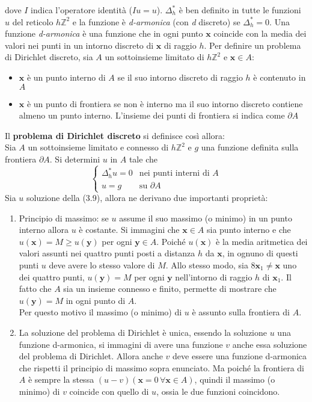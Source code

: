 \documentclass[a4paper,12pt, draft]{article}
\theoremstyle{break}
\numberwithin{equation}{section}
\begin{document}
dove \(I\) indica l'operatore identità (\(Iu = u\)). \(\Delta_h^*\) è ben definito in tutte le funzioni \(u\) del reticolo \(h\mathbb{Z}^2\) e la funzione è \emph{d-armonica} (con \emph{d} discreto) se \(\Delta_h^* = 0\).
Una funzione \emph{d-armonica} è una funzione che in ogni punto \(\bm{x}\) coincide con la media dei valori nei punti in un intorno discreto di \(\bm{x}\) di raggio \(h\).
Per definire un problema di Dirichlet discreto, sia \(A\) un sottoinsieme limitato di \(h\mathbb{Z}^2\) e \(\bm{x} \in A\):
\begin{itemize}
  \item \(\bm{x}\) è un punto interno di \(A\) se il suo intorno discreto di raggio \(h\) è contenuto in \(A\)
  \item $\bm{x}$ è un punto di frontiera se non è interno ma il suo intorno discreto contiene almeno un punto interno. L'insieme dei punti di frontiera si indica come \(\partial A\)
\end{itemize}
Il \textbf{problema di Dirichlet discreto} si definisce così allora: \\
Sia \(A\) un sottoinsieme limitato e connesso di \(h\mathbb{Z}^2\) e \(g\) una funzione definita sulla frontiera \(\partial A\). Si determini \(u\) in \(A\) tale che 
\begin{equation}
  \begin{cases}
    \Delta_h^* u= 0 & \mbox{nei punti interni di }A \\
    u = g & \mbox{su }\partial A
  \end{cases}
\end{equation}
Sia \(u\) soluzione della (3.9), allora ne derivano due importanti proprietà:
\begin{enumerate}
  \item Principio di massimo: se \(u\) assume il suo massimo (o minimo) in un punto interno allora \(u\) è costante. Si immagini che \(\bm{x} \in A\) sia punto interno e che \(u(\bm{x}) = M \geq u(\bm{y})\) per ogni \(\bm{y} \in A\). Poiché \(u(\bm{x})\) è la media aritmetica dei valori assunti nei quattro punti posti a distanza \(h\) da \(\bm{x}\), in ognuno di questi punti \(u\) deve avere lo stesso valore di \(M\). Allo stesso modo, sia 8\(\bm{x}_1 \not = \bm{x}\) uno dei quattro punti, \(u(\bm{y}) = M\) per ogni \(\bm{y}\) nell'intorno di raggio \(h\) di \(\bm{x}_1\). Il fatto che \(A\) sia un insieme connesso e finito, permette di mostrare che \(u(\bm{y}) = M\) in ogni punto di \(A\). \\
  Per questo motivo il massimo (o minimo) di \(u\) è assunto sulla frontiera di \(A\).
  \item La soluzione del problema di Dirichlet è unica, essendo la soluzione \(u\) una funzione d-armonica, si immagini di avere una funzione \(v\) anche essa soluzione del problema di Dirichlet. Allora anche \(v\) deve essere una funzione d-armonica che rispetti il principio di massimo sopra enunciato. Ma poiché la frontiera di \(A\) è sempre la stessa \((u-v)(\bm{x} = 0 \, \forall \bm{x} \in A)\), quindi il massimo (o minimo) di \(v\) coincide con quello di \(u\), ossia le due funzioni coincidono.
\end{enumerate}
\end{document}
